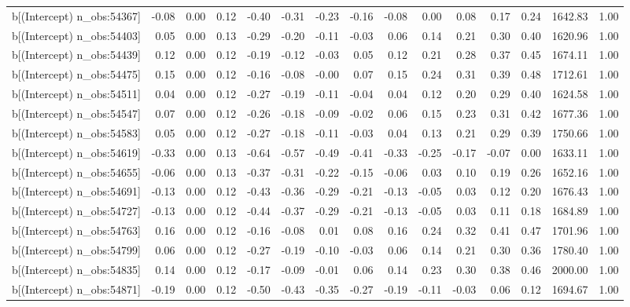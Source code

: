 \begin{table}[ht]
\begin{tabular}{rrrrrrrrrrrrrrr}
  b[(Intercept) n\_obs:54367] & -0.08 & 0.00 & 0.12 & -0.40 & -0.31 & -0.23 & -0.16 & -0.08 & 0.00 & 0.08 & 0.17 & 0.24 & 1642.83 & 1.00 \\ 
  b[(Intercept) n\_obs:54403] & 0.05 & 0.00 & 0.13 & -0.29 & -0.20 & -0.11 & -0.03 & 0.06 & 0.14 & 0.21 & 0.30 & 0.40 & 1620.96 & 1.00 \\ 
  b[(Intercept) n\_obs:54439] & 0.12 & 0.00 & 0.12 & -0.19 & -0.12 & -0.03 & 0.05 & 0.12 & 0.21 & 0.28 & 0.37 & 0.45 & 1674.11 & 1.00 \\ 
  b[(Intercept) n\_obs:54475] & 0.15 & 0.00 & 0.12 & -0.16 & -0.08 & -0.00 & 0.07 & 0.15 & 0.24 & 0.31 & 0.39 & 0.48 & 1712.61 & 1.00 \\ 
  b[(Intercept) n\_obs:54511] & 0.04 & 0.00 & 0.12 & -0.27 & -0.19 & -0.11 & -0.04 & 0.04 & 0.12 & 0.20 & 0.29 & 0.40 & 1624.58 & 1.00 \\ 
  b[(Intercept) n\_obs:54547] & 0.07 & 0.00 & 0.12 & -0.26 & -0.18 & -0.09 & -0.02 & 0.06 & 0.15 & 0.23 & 0.31 & 0.42 & 1677.36 & 1.00 \\ 
  b[(Intercept) n\_obs:54583] & 0.05 & 0.00 & 0.12 & -0.27 & -0.18 & -0.11 & -0.03 & 0.04 & 0.13 & 0.21 & 0.29 & 0.39 & 1750.66 & 1.00 \\ 
  b[(Intercept) n\_obs:54619] & -0.33 & 0.00 & 0.13 & -0.64 & -0.57 & -0.49 & -0.41 & -0.33 & -0.25 & -0.17 & -0.07 & 0.00 & 1633.11 & 1.00 \\ 
  b[(Intercept) n\_obs:54655] & -0.06 & 0.00 & 0.13 & -0.37 & -0.31 & -0.22 & -0.15 & -0.06 & 0.03 & 0.10 & 0.19 & 0.26 & 1652.16 & 1.00 \\ 
  b[(Intercept) n\_obs:54691] & -0.13 & 0.00 & 0.12 & -0.43 & -0.36 & -0.29 & -0.21 & -0.13 & -0.05 & 0.03 & 0.12 & 0.20 & 1676.43 & 1.00 \\ 
  b[(Intercept) n\_obs:54727] & -0.13 & 0.00 & 0.12 & -0.44 & -0.37 & -0.29 & -0.21 & -0.13 & -0.05 & 0.03 & 0.11 & 0.18 & 1684.89 & 1.00 \\ 
  b[(Intercept) n\_obs:54763] & 0.16 & 0.00 & 0.12 & -0.16 & -0.08 & 0.01 & 0.08 & 0.16 & 0.24 & 0.32 & 0.41 & 0.47 & 1701.96 & 1.00 \\ 
  b[(Intercept) n\_obs:54799] & 0.06 & 0.00 & 0.12 & -0.27 & -0.19 & -0.10 & -0.03 & 0.06 & 0.14 & 0.21 & 0.30 & 0.36 & 1780.40 & 1.00 \\ 
  b[(Intercept) n\_obs:54835] & 0.14 & 0.00 & 0.12 & -0.17 & -0.09 & -0.01 & 0.06 & 0.14 & 0.23 & 0.30 & 0.38 & 0.46 & 2000.00 & 1.00 \\ 
  b[(Intercept) n\_obs:54871] & -0.19 & 0.00 & 0.12 & -0.50 & -0.43 & -0.35 & -0.27 & -0.19 & -0.11 & -0.03 & 0.06 & 0.12 & 1694.67 & 1.00 \\ 

\end{tabular}
\end{table}
